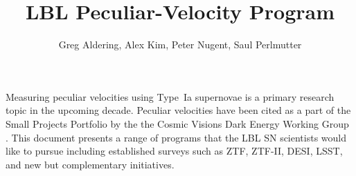 \documentclass[11pt, oneside]{article}   	%
\title{LBL Peculiar-Velocity Program}
\author{Greg Aldering, Alex Kim, Peter Nugent, Saul Perlmutter}
\begin{document}
\maketitle


Measuring peculiar velocities using Type~Ia supernovae is a primary research topic in the upcoming decade.  Peculiar velocities have
been cited as a part of the   Small Projects Portfolio  by the the Cosmic Visions Dark Energy Working Group \citep{2018arXiv180207216D}.
This document presents a range of programs that the LBL SN scientists would like to pursue including established surveys such as ZTF, ZTF-II,
DESI, LSST, and new but complementary initiatives.













\end{document}
